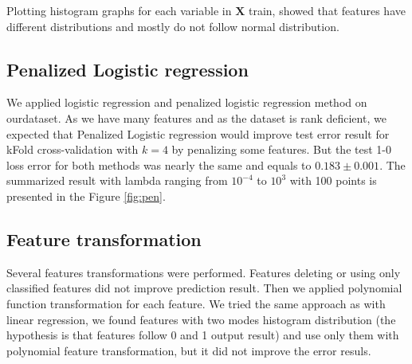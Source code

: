 \documentclass{article} %
\begin{document}
Plotting histogram graphs for each variable in $\mathbf{X}$ train, showed that features have different distributions and mostly do not follow normal distribution.

\begin{figure}[!t]
\center
{}
\hfill
\caption{}
\end{figure}

\subsection{Penalized Logistic regression}
We applied logistic regression and penalized logistic regression method on
ourdataset. As we have many features and as the dataset is rank deficient, we expected that Penalized Logistic
regression would improve test error result for kFold cross-validation with $k=4$
by penalizing some features. But the test 1-0 loss error for both methods was
nearly the same and equals to $0.183\pm0.001$. The summarized result with lambda
ranging from $10^{-4}$ to $10^3$  with 100 points is presented in the Figure \ref{fig:pen}. 

\subsection{Feature transformation}
Several features transformations were performed. Features deleting or using only
classified features did not improve prediction result. Then we applied
polynomial function transformation for each feature. We tried the same approach
as with linear regression, we found features with two modes histogram
distribution (the hypothesis is that features follow 0 and 1 output result) and
use only them with polynomial feature transformation, but it did not improve the
error resuls.
\end{document}
